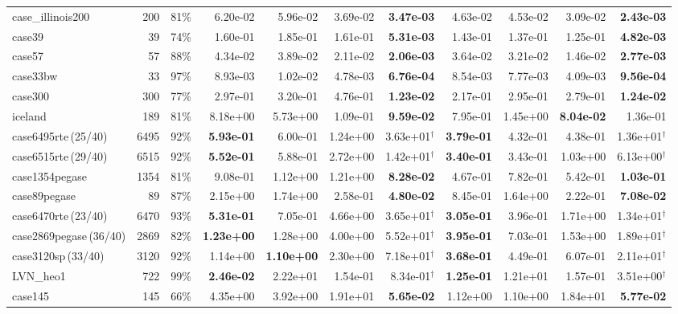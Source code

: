 \documentclass[10pt]{article}
\begin{document}
\begin{landscape}
\begin{table}[H]
\begin{tabular}{lrr rrrr rrrr}
case\_illinois200 & 200 & 81\% & 6.20e-02 & 5.96e-02 & 3.69e-02 & \textbf{3.47e-03} & 4.63e-02 & 4.53e-02 & 3.09e-02 & \textbf{2.43e-03} \\
case39 & 39 & 74\% & 1.60e-01 & 1.85e-01 & 1.61e-01 & \textbf{5.31e-03} & 1.43e-01 & 1.37e-01 & 1.25e-01 & \textbf{4.82e-03} \\
case57 & 57 & 88\% & 4.34e-02 & 3.89e-02 & 2.11e-02 & \textbf{2.06e-03} & 3.64e-02 & 3.21e-02 & 1.46e-02 & \textbf{2.77e-03} \\
case33bw & 33 & 97\% & 8.93e-03 & 1.02e-02 & 4.78e-03 & \textbf{6.76e-04} & 8.54e-03 & 7.77e-03 & 4.09e-03 & \textbf{9.56e-04} \\
case300 & 300 & 77\% & 2.97e-01 & 3.20e-01 & 4.76e-01 & \textbf{1.23e-02} & 2.17e-01 & 2.95e-01 & 2.79e-01 & \textbf{1.24e-02} \\
iceland & 189 & 81\% & 8.18e+00 & 5.73e+00 & 1.09e-01 & \textbf{9.59e-02} & 7.95e-01 & 1.45e+00 & \textbf{8.04e-02} & 1.36e-01 \\
case6495rte\,(25/40) & 6495 & 92\% & \textbf{5.93e-01} & 6.00e-01 & 1.24e+00 & 3.63e+01$^\dagger$ & \textbf{3.79e-01} & 4.32e-01 & 4.38e-01 & 1.36e+01$^\dagger$ \\
case6515rte\,(29/40) & 6515 & 92\% & \textbf{5.52e-01} & 5.88e-01 & 2.72e+00 & 1.42e+01$^\dagger$ & \textbf{3.40e-01} & 3.43e-01 & 1.03e+00 & 6.13e+00$^\dagger$ \\
case1354pegase & 1354 & 81\% & 9.08e-01 & 1.12e+00 & 1.21e+00 & \textbf{8.28e-02} & 4.67e-01 & 7.82e-01 & 5.42e-01 & \textbf{1.03e-01} \\
case89pegase & 89 & 87\% & 2.15e+00 & 1.74e+00 & 2.58e-01 & \textbf{4.80e-02} & 8.45e-01 & 1.64e+00 & 2.22e-01 & \textbf{7.08e-02} \\
case6470rte\,(23/40) & 6470 & 93\% & \textbf{5.31e-01} & 7.05e-01 & 4.66e+00 & 3.65e+01$^\dagger$ & \textbf{3.05e-01} & 3.96e-01 & 1.71e+00 & 1.34e+01$^\dagger$ \\
case2869pegase\,(36/40) & 2869 & 82\% & \textbf{1.23e+00} & 1.28e+00 & 4.00e+00 & 5.52e+01$^\dagger$ & \textbf{3.95e-01} & 7.03e-01 & 1.53e+00 & 1.89e+01$^\dagger$ \\
case3120sp\,(33/40) & 3120 & 92\% & 1.14e+00 & \textbf{1.10e+00} & 2.30e+00 & 7.18e+01$^\dagger$ & \textbf{3.68e-01} & 4.49e-01 & 6.07e-01 & 2.11e+01$^\dagger$ \\
LVN\_heo1 & 722 & 99\% & \textbf{2.46e-02} & 2.22e+01 & 1.54e-01 & 8.34e-01$^\dagger$ & \textbf{1.25e-01} & 1.21e+01 & 1.57e-01 & 3.51e+00$^\dagger$ \\
case145 & 145 & 66\% & 4.35e+00 & 3.92e+00 & 1.91e+01 & \textbf{5.65e-02} & 1.12e+00 & 1.10e+00 & 1.84e+01 & \textbf{5.77e-02} \\

\end{tabular}
\end{table}
\end{landscape}
\end{document}
